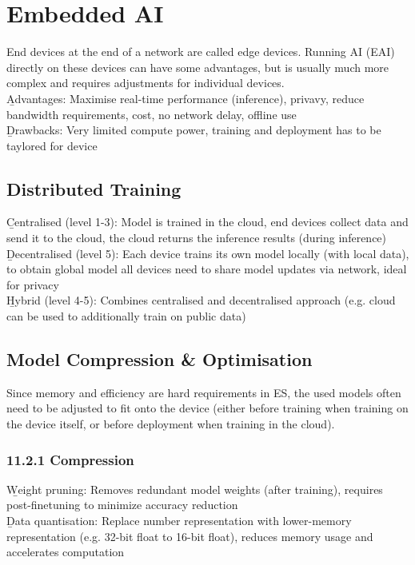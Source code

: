 \section{Embedded AI}
End devices at the end of a network are called edge devices. Running AI (EAI) directly on these devices can have some advantages, but is usually much more complex and requires adjustments for individual devices.\hfill\\

\b{Advantages:} Maximise real-time performance (inference), privavy, reduce bandwidth requirements, cost, no network delay, offline use\hfill\\[0.5em]
\b{Drawbacks:} Very limited compute power, training and deployment has to be taylored for device\hfill

\subsection{Distributed Training}
\b{Centralised (level 1-3):} Model is trained in the cloud, end devices collect data and send it to the cloud, the cloud returns the inference results (during inference)\\[0.5em]
\b{Decentralised (level 5):} Each device trains its own model locally (with local data), to obtain global model all devices need to share model updates via network, ideal for privacy\\[0.5em]
\b{Hybrid (level 4-5):} Combines centralised and decentralised approach (e.g. cloud can be used to additionally train on public data)

\clearpage
\subsection{Model Compression \& Optimisation}
Since memory and efficiency are hard requirements in ES, the used models often need to be adjusted to fit onto the device (either before training when training on the device itself, or before deployment when training in the cloud).

\subsubsection{11.2.1 Compression}
\b{Weight pruning:} Removes redundant model weights (after training), requires post-finetuning to minimize accuracy reduction \\[0.5em]
\b{Data quantisation:} Replace number representation with lower-memory representation (e.g. 32-bit float to 16-bit float), reduces memory usage and accelerates computation

